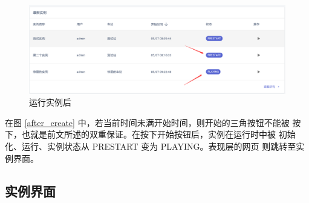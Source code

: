 \begin{figure}[htbp!]
    \centering
    \includegraphics[width=\textwidth]{figures/png/3rd.png}
    \caption{\label{3rd}运行实例后}
\end{figure}

在图 \ref{after_create} 中，若当前时间未满开始时间，则开始的三角按钮不能被
按下，也就是前文所述的双重保证。在按下开始按钮后，实例在运行时中被
初始化、运行、实例状态从 PRESTART 变为 PLAYING。表现层的网页
则跳转至实例界面。

\subsection{实例界面}